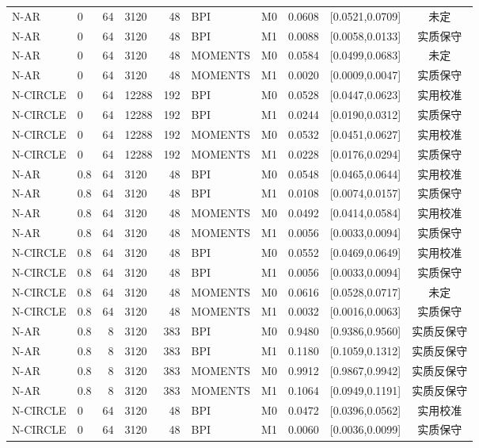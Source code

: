 \documentclass[UTF8,zihao=-4]{ctexart}
\theoremstyle{remark}
\begin{document}
\begin{longtable}{llrlrlrrc c}
N-AR & 0 & 64 & 3120 & 48 & BPI & M0 & 0.0608 & [0.0521,0.0709] & 未定\\
N-AR & 0 & 64 & 3120 & 48 & BPI & M1 & 0.0088 & [0.0058,0.0133] & 实质保守\\
N-AR & 0 & 64 & 3120 & 48 & MOMENTS & M0 & 0.0584 & [0.0499,0.0683] & 未定\\
N-AR & 0 & 64 & 3120 & 48 & MOMENTS & M1 & 0.0020 & [0.0009,0.0047] & 实质保守\\
N-CIRCLE & 0 & 64 & 12288 & 192 & BPI & M0 & 0.0528 & [0.0447,0.0623] & 实用校准\\
N-CIRCLE & 0 & 64 & 12288 & 192 & BPI & M1 & 0.0244 & [0.0190,0.0312] & 实质保守\\
N-CIRCLE & 0 & 64 & 12288 & 192 & MOMENTS & M0 & 0.0532 & [0.0451,0.0627] & 实用校准\\
N-CIRCLE & 0 & 64 & 12288 & 192 & MOMENTS & M1 & 0.0228 & [0.0176,0.0294] & 实质保守\\
N-AR & 0.8 & 64 & 3120 & 48 & BPI & M0 & 0.0548 & [0.0465,0.0644] & 实用校准\\
N-AR & 0.8 & 64 & 3120 & 48 & BPI & M1 & 0.0108 & [0.0074,0.0157] & 实质保守\\
N-AR & 0.8 & 64 & 3120 & 48 & MOMENTS & M0 & 0.0492 & [0.0414,0.0584] & 实用校准\\
N-AR & 0.8 & 64 & 3120 & 48 & MOMENTS & M1 & 0.0056 & [0.0033,0.0094] & 实质保守\\
N-CIRCLE & 0.8 & 64 & 3120 & 48 & BPI & M0 & 0.0552 & [0.0469,0.0649] & 实用校准\\
N-CIRCLE & 0.8 & 64 & 3120 & 48 & BPI & M1 & 0.0056 & [0.0033,0.0094] & 实质保守\\
N-CIRCLE & 0.8 & 64 & 3120 & 48 & MOMENTS & M0 & 0.0616 & [0.0528,0.0717] & 未定\\
N-CIRCLE & 0.8 & 64 & 3120 & 48 & MOMENTS & M1 & 0.0032 & [0.0016,0.0063] & 实质保守\\
N-AR & 0.8 & 8 & 3120 & 383 & BPI & M0 & 0.9480 & [0.9386,0.9560] & 实质反保守\\
N-AR & 0.8 & 8 & 3120 & 383 & BPI & M1 & 0.1180 & [0.1059,0.1312] & 实质反保守\\
N-AR & 0.8 & 8 & 3120 & 383 & MOMENTS & M0 & 0.9912 & [0.9867,0.9942] & 实质反保守\\
N-AR & 0.8 & 8 & 3120 & 383 & MOMENTS & M1 & 0.1064 & [0.0949,0.1191] & 实质反保守\\
N-CIRCLE & 0 & 64 & 3120 & 48 & BPI & M0 & 0.0472 & [0.0396,0.0562] & 实用校准\\
N-CIRCLE & 0 & 64 & 3120 & 48 & BPI & M1 & 0.0060 & [0.0036,0.0099] & 实质保守\\

\end{longtable}
\end{document}
